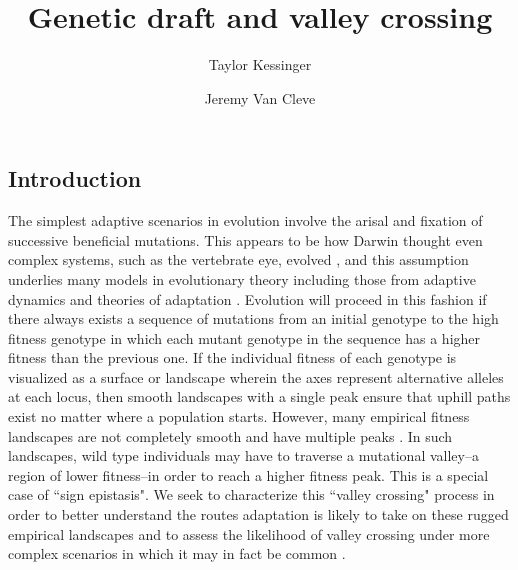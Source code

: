 \documentclass[10pt,twocolumn,twoside]{gsajnl}
\title{Genetic draft and valley crossing}
\author[$\ast$]{Taylor Kessinger}
\author[$\ast$,1]{Jeremy Van Cleve}
\affil[$\ast$]{Department of Biology, University of Kentucky}
\begin{document}
\maketitle
\thispagestyle{firststyle}
\marginmark
\firstpagefootnote



\begin{spacing}{1.5}

\section{Introduction}

The simplest adaptive scenarios in evolution involve the arisal and fixation of successive beneficial mutations.
This appears to be how Darwin thought even complex systems, such as the vertebrate eye, evolved \citep{darwin_1859}, and this assumption underlies many models in evolutionary theory including those from adaptive dynamics \citep{Geritz:Kisdi:1998,Dercole:Rinaldi:2008} and theories of adaptation \citep{Gillespie:1983,Orr:1998,Gillespie:1991}.
Evolution will proceed in this fashion if there always exists a sequence of mutations from an initial genotype to the high fitness genotype in which each mutant genotype in the sequence has a higher fitness than the previous one.
If the individual fitness of each genotype is visualized as a surface or landscape wherein the axes represent alternative alleles at each locus, then smooth landscapes with a single peak ensure that uphill paths exist no matter where a population starts.
However, many empirical fitness landscapes are not completely smooth and have multiple peaks \citep[reviewed in][]{Szendro:Schenk:2013,Visser:Krug:2014,Obolski:Ram:2018}.
In such landscapes, wild type individuals may have to traverse a mutational valley--a region of lower fitness--in order to reach a higher fitness peak.
This is a special case of ``sign epistasis".
We seek to characterize this ``valley crossing" process in order to better understand the routes adaptation is likely to take on these rugged empirical landscapes \citep[e.g.,][]{Aguilar-Rodriguez:Payne:2017} and to assess the likelihood of valley crossing under more complex scenarios in which it may in fact be common \citep[e.g.][]{trotter_2014}.


\end{spacing}
\end{document}

